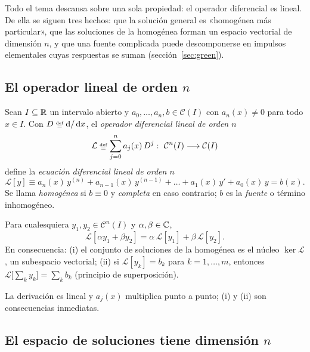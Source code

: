 \documentclass[11pt,twoside]{article}
\newcommand\Lop{\mathcal L}
\newcommand\Cl{\mathcal C}
\begin{document}
Todo el tema descansa sobre una sola propiedad: el operador diferencial es lineal. De ella se siguen tres hechos: que la
solución general es «homogénea más particular», que las soluciones de la homogénea forman un espacio vectorial de
dimensión $n$, y que una fuente complicada puede descomponerse en impulsos elementales cuyas respuestas se suman
(sección~\ref{sec:green}).

\subsection{El operador lineal de orden $n$}

\begin{definicion}\label{def:edo}
Sean $I\subseteq\mathbb{R}$ un intervalo abierto y $a_0,\dots,a_n,b\in\Cl(I)$ con $a_n(x)\neq0$ para todo $x\in I$. Con
$D\defeq\dd/\dd x$, el \emph{operador diferencial lineal de orden $n$}
\begin{equation}\label{eq:L}
\Lop\defeq\sum_{j=0}^{n}a_j(x)\,D^j:\ \Cl^n(I)\longrightarrow\Cl(I)
\end{equation}
define la \emph{ecuación diferencial lineal de orden $n$}
\begin{equation}\label{eq:edo}
\Lop[y]\equiv a_n(x)\,y^{(n)}+a_{n-1}(x)\,y^{(n-1)}+\dots+a_1(x)\,y'+a_0(x)\,y=b(x).
\end{equation}
Se llama \emph{homogénea} si $b\equiv0$ y \emph{completa} en caso contrario; $b$ es la \emph{fuente} o término inhomogéneo.
\end{definicion}

\begin{proposicion}\label{prop:linealidad}
Para cualesquiera $y_1,y_2\in\Cl^n(I)$ y $\alpha,\beta\in\mathbb{C}$,
\begin{equation*}
\Lop[\alpha y_1+\beta y_2]=\alpha\,\Lop[y_1]+\beta\,\Lop[y_2].
\end{equation*}
En consecuencia: (i) el conjunto de soluciones de la homogénea es el núcleo $\ker\Lop$, un subespacio vectorial; (ii) si
$\Lop[y_k]=b_k$ para $k=1,\dots,m$, entonces $\Lop\big[\sum_ky_k\big]=\sum_kb_k$ (principio de superposición).
\end{proposicion}

\begin{demostracion}
La derivación es lineal y $a_j(x)$ multiplica punto a punto; (i) y (ii) son consecuencias inmediatas.
\end{demostracion}

\subsection{El espacio de soluciones tiene dimensión $n$}
\end{document}
